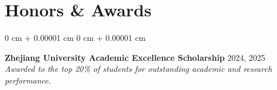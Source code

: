 \documentclass[11pt, letterpaper]{article}
\newenvironment{onecolentry}{
    \begin{adjustwidth}{
        0 cm + 0.00001 cm
    }{
        0 cm + 0.00001 cm
    }
}{
    \end{adjustwidth}
}
\begin{document}
    \section{Honors \& Awards}

        \begin{onecolentry}
            \textbf{Zhejiang University Academic Excellence Scholarship}
            \hfill 2024, 2025 \\

            \textit{Awarded to the top 20\% of students for outstanding
            academic and research performance.}
        \end{onecolentry}
\end{document}
